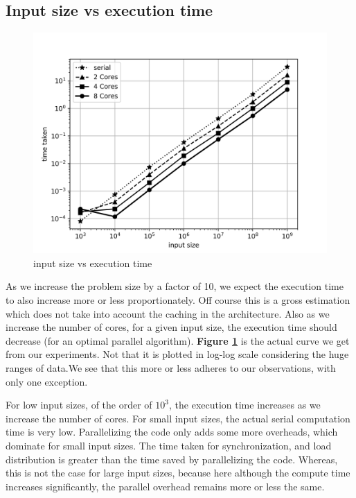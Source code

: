 \documentclass[12,a4paper]{article}
\begin{document}
{    \subsection{Input size vs execution time}
    \begin{figure}[H]
        \centering
        \includegraphics[width=\textwidth]{pitime.png}
        \caption{input size vs execution time}
        \label{fig:q1p9}
    \end{figure}
    As we increase the problem size by a factor of 10, we expect the execution time to also increase more or less proportionately. Off course this is a gross estimation which does not take into account the caching in the architecture. Also as we increase the number of cores, for a given input size, the execution time should decrease (for an optimal parallel algorithm). \textbf{Figure \ref{fig:q1p9}} is the actual curve we get from our experiments. Not that it is plotted in log-log scale considering the huge ranges of data.We see that this more or less adheres to our observations, with only one exception.
    
    For low input sizes, of the order of $10^3$, the execution time increases as we increase the number of cores. For small input sizes, the actual serial computation time is very low. Parallelizing the code only adds some more overheads, which dominate for small input sizes. The time taken for synchronization, and load distribution is greater than the time saved by parallelizing the code. Whereas, this is not the case for large input sizes, because here although the compute time increases significantly, the parallel overhead remains more or less the same.
    \newpage
}
\end{document}

